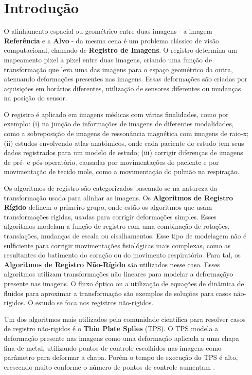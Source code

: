 \chapter{Introdução}
\label{cap:introducao}

  O alinhamento espacial ou geométrico entre duas imagens - a imagem
\textbf{Referência} e a \textbf{Alvo} - da mesma cena é um problema clássico de
visão computacional, chamado de \textbf{Registro de Imagens}. O registro
determina um mapeamento pixel a pixel entre duas imagens, criando uma função de
transformação que leva uma das imagens para o espaço geométrico da outra,
atenuando deformações presentes nas imagens. Essas deformações são criadas por
aquisições em horários diferentes, utilização de sensores diferentes ou
mudanças na posição do sensor.

  O registro é aplicado em imagens médicas com várias finalidades, como por
exemplo: (i) na junção de informações de imagens de diferentes modalidades,
como a sobreposição de imagens de ressonância magnética com imagens de raio-x;
(ii) estudos envolvendo atlas anatómicos, onde cada paciente do estudo tem seus
dados registrados para um modelo de estudo; (iii) corrigir diferenças de
imagens de pré- e pós-operatório, causadas por movimentações do paciente e por
movimentação de tecido mole, como a movimentação do pulmão na respiração.

  Os algoritmos de registro são categorizados baseando-se na natureza da
transformação usada para alinhar as imagens. Os \textbf{Algoritmos de Registro
Rígido} definem o primeiro grupo, onde estão os algoritmos que usam
transformações rigidas, usadas para corrigir deformações simples. Esses
algoritmos modelam a função de registro com uma combinação de rotações,
translações, mudanças de escala ou cisalhamentos. Esse tipo de modelagem não
é sulficiente para corrigir movimentações fisiológicas mais complexas, como
as resultantes do batimento do coração ou do movimento respiratório. Para tal,
os \textbf{Algoritmos de Registro Não-Rígido} são utilizados nesse caso. Esses
algoritmos utilizam transformações não lineares para modelar a deformaçãyo
presente nas imagens. O fluxo óptico ou a utilização de equações de dinâmica de
fluidos para aproximar a transformação são exemplos de soluções para casos
não-rigidos. O estudo se foca nos registros não-rigidos.

  Um dos algoritmos mais utilizados pela comunidade cientifica para resolver
casos de registro não-rigidos é o \textbf{Thin Plate Splies} (TPS). O TPS
modela a deformação presente nas imagens como uma deformação aplicada a uma
chapa fina de metal, utilizando pontos de controle escolhidos nas imagens
como parâmetro para deformar a chapa. Porém o tempo de execução do TPS é alto,
crescendo muito conforme o número de pontos de controle aumentam
\cite{zitova2003image}.

